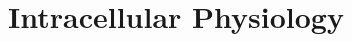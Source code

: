 \documentclass[10pt,a4paper]{article}
\newcommand{\um}{$\mu$m}
\begin{document}


\section{ Intracellular  Physiology}

\begin{landscape}
{\small{}}  
\end{landscape}


\end{document}
